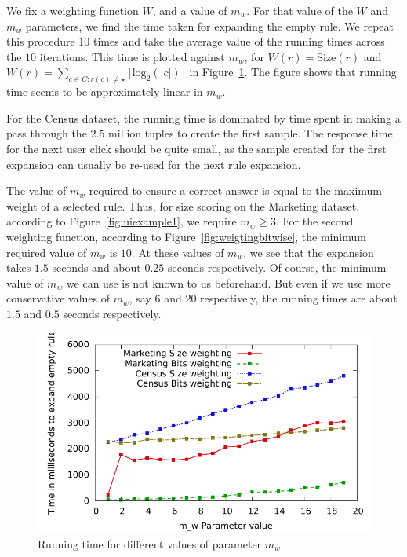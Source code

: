 \documentclass[10pt,journal,compsoc]{IEEEtran}
\begin{document}
We fix a weighting function $W$, and a value of $m_w$. For that value of the $W$ and $m_w$ parameters, we find the time taken for expanding the empty rule. We repeat this procedure $10$ times and take the average value of the running times across the $10$ iterations. This time is plotted against $m_w$, for $W(r) = \text{Size}(r)$ and $W(r) = \sum_{c \in C : r(c) \neq \star} \lceil \text{log}_2(|c|) \rceil$ in Figure~\ref{fig:mw_speed}. The figure shows that running time seems to be approximately linear in $m_w$. 

For the Census dataset, the running time is dominated by time spent in making a pass through the $2.5$ million tuples to create the first sample. The response time for the next user click should be quite small, as the sample created for the first expansion can usually be re-used for the next rule expansion.

The value of $m_w$ required to ensure a correct answer is equal to the maximum weight of a selected rule. Thus, for size scoring on the Marketing dataset, according to Figure~\ref{fig:uiexample1}, we require $m_w \geq 3$. For the second weighting function, according to Figure~\ref{fig:weigtingbitwise}, the minimum required value of $m_w$ is $10$. At these values of $m_w$, we see that the expansion takes $1.5$ seconds and about $0.25$ seconds respectively. Of course, the minimum value of $m_w$ we can use is not known to us beforehand. But even if we use more conservative values of $m_w$, say $6$ and $20$ respectively, the running times are about $1.5$ and $0.5$ seconds respectively.

\begin{figure}
\centering
  \includegraphics[scale=0.5]{graphs/mw_speed.pdf}%
  \caption{Running time for different values of parameter $m_w$ \label{fig:mw_speed}}
\vspace{-10pt}
\end{figure}
\end{document}
